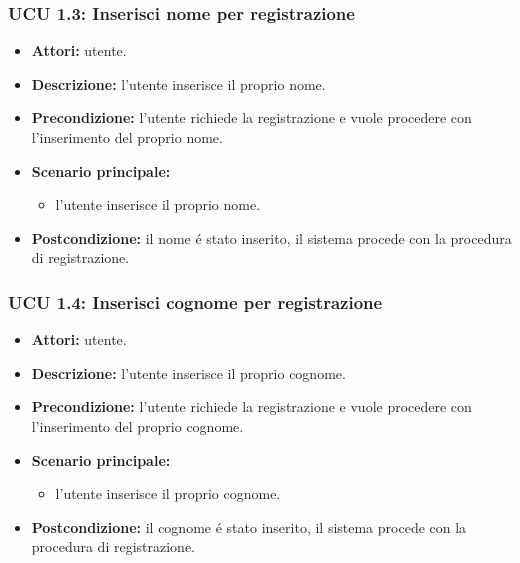 \subsubsection{UCU 1.3: Inserisci nome per registrazione}
\begin{itemize}
	\item \textbf{Attori: } utente.
	\item \textbf{Descrizione: } l'utente inserisce il proprio nome.
	\item \textbf{Precondizione: } l'utente richiede la registrazione e vuole procedere con l'inserimento del proprio nome.
	\item \textbf{Scenario principale:}
	\begin{itemize}
		\item l'utente inserisce il proprio nome.
	\end{itemize}
	\item \textbf{Postcondizione: } il nome é stato inserito, il sistema procede con la procedura di registrazione.
\end{itemize}

\subsubsection{UCU 1.4: Inserisci cognome per registrazione}
\begin{itemize}
	\item \textbf{Attori: } utente.
	\item \textbf{Descrizione: } l'utente inserisce il proprio cognome.
	\item \textbf{Precondizione: } l'utente richiede la registrazione e vuole procedere con l'inserimento del proprio cognome.
	\item \textbf{Scenario principale:}
	\begin{itemize}
		\item l'utente inserisce il proprio cognome.
	\end{itemize}
	\item \textbf{Postcondizione: } il cognome é stato inserito, il sistema procede con la procedura di registrazione.
\end{itemize}

